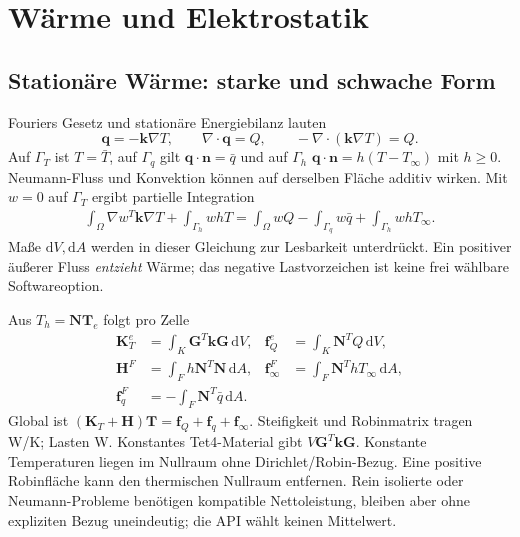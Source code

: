 \chapter{Wärme und Elektrostatik}\label{chap:scalar}
\section{Stationäre Wärme: starke und schwache Form}
Fouriers Gesetz und stationäre Energiebilanz lauten
\begin{equation}\label{eq:heat-strong}
\mathbf q=-\mathbf k\nabla T,\qquad
\nabla\cdot\mathbf q=Q,\qquad-\nabla\cdot(\mathbf k\nabla T)=Q.
\end{equation}
Auf $\Gamma_T$ ist $T=\bar T$, auf $\Gamma_q$ gilt
$\mathbf q\cdot\mathbf n=\bar q$ und auf $\Gamma_h$
$\mathbf q\cdot\mathbf n=h(T-T_\infty)$ mit $h\ge0$.
Neumann-Fluss und Konvektion können auf derselben Fläche additiv wirken.
Mit $w=0$ auf $\Gamma_T$ ergibt partielle Integration
\begin{align}\label{eq:heat-weak}
\int_\Omega\nabla w^T\mathbf k\nabla T
+\int_{\Gamma_h}whT
=\int_\Omega wQ-\int_{\Gamma_q}w\bar q
+\int_{\Gamma_h}whT_\infty.
\end{align}
Maße $\mathrm dV,\mathrm dA$ werden in dieser Gleichung zur Lesbarkeit
unterdrückt. Ein positiver äußerer Fluss \emph{entzieht} Wärme; das negative
Lastvorzeichen ist keine frei wählbare Softwareoption.

Aus $T_h=\mathbf N\mathbf T_e$ folgt pro Zelle
\begin{align}\label{eq:thermal-discrete}
\mathbf K_T^e&=\int_K\mathbf G^T\mathbf k\mathbf G\,\mathrm dV,&
\mathbf f_Q^e&=\int_K\mathbf N^T Q\,\mathrm dV,\\
\mathbf H^F&=\int_F h\mathbf N^T\mathbf N\,\mathrm dA,&
\mathbf f_{\infty}^F&=\int_F\mathbf N^ThT_\infty\,\mathrm dA,\nonumber\\
\mathbf f_q^F&=-\int_F\mathbf N^T\bar q\,\mathrm dA.&&\nonumber
\end{align}
Global ist $(\mathbf K_T+\mathbf H)\mathbf T=\mathbf f_Q+\mathbf f_q+
\mathbf f_\infty$. Steifigkeit und Robinmatrix tragen W/K; Lasten W.
Konstantes Tet4-Material gibt $V\mathbf G^T\mathbf k\mathbf G$.
Konstante Temperaturen liegen im Nullraum ohne Dirichlet/Robin-Bezug.
Eine positive Robinfläche kann den thermischen Nullraum entfernen.
Rein isolierte oder Neumann-Probleme benötigen kompatible Nettoleistung,
bleiben aber ohne expliziten Bezug uneindeutig; die API wählt keinen Mittelwert.

